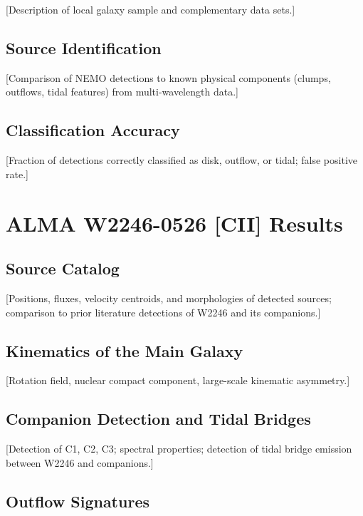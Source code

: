 \documentclass{aa}
\begin{document}
[Description of local galaxy sample and complementary data sets.]

\subsection{Source Identification}
\label{sec:local_id}

[Comparison of NEMO detections to known physical components (clumps, outflows, tidal features) from multi-wavelength data.]

\subsection{Classification Accuracy}
\label{sec:local_accuracy}

[Fraction of detections correctly classified as disk, outflow, or tidal; false positive rate.]

\section{ALMA W2246-0526 [CII] Results}
\label{sec:w2246}

\subsection{Source Catalog}
\label{sec:w2246_catalog}

[Positions, fluxes, velocity centroids, and morphologies of detected sources; comparison to prior literature detections of W2246 and its companions.]

\subsection{Kinematics of the Main Galaxy}
\label{sec:w2246_main}

[Rotation field, nuclear compact component, large-scale kinematic asymmetry.]

\subsection{Companion Detection and Tidal Bridges}
\label{sec:w2246_companions}

[Detection of C1, C2, C3; spectral properties; detection of tidal bridge emission between W2246 and companions.]

\subsection{Outflow Signatures}
\label{sec:w2246_outflow}
\end{document}
